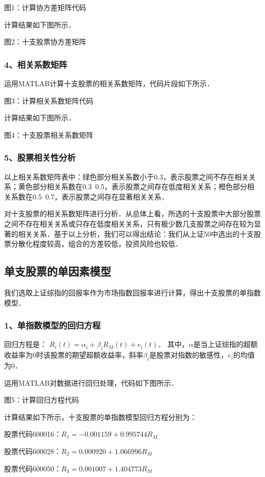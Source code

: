 图1：计算协方差矩阵代码

计算结果如下图所示．

图2：十支股票协方差矩阵

\subsubsection{4、相关系数矩阵}
运用MATLAB计算十支股票的相关系数矩阵，代码片段如下所示．

图3：计算相关系数矩阵代码

计算结果如下图所示．

图4：十支股票相关系数矩阵
\subsubsection{5、股票相关性分析}
以上相关系数矩阵表中：绿色部分相关系数小于0.3，表示股票之间不存在相关关系；黄色部分相关系数在0.3~0.5，表示股票之间存在低度相关关系；橙色部分相关系数在0.5~0.7，表示股票之间存在显著相关关系．

对十支股票的相关系数矩阵进行分析．从总体上看，所选的十支股票中大部分股票之间不存在相关关系或只存在低度相关关系，只有极少数几支股票之间存在较为显著的相关关系．基于以上分析，我们可以得出结论：我们从上证50中选出的十支股票分散化程度较高，组合的方差较低，投资风险也较低．

\subsection{单支股票的单因素模型}
我们选取上证综指的回报率作为市场指数回报率进行计算，得出十支股票的单指数模型．
\subsubsection{1、单指数模型的回归方程}

回归方程是：
$R_{i}(t)=\alpha_{i}+\beta_{i}R_{M}(t)+e_{i}(t)$．
其中，$\alpha$是当上证综指的超额收益率为0时该股票的期望超额收益率，斜率$\beta_{i}$是股票对指数的敏感性，$e_{i}$的均值为0．

运用MATLAB对数据进行回归处理，代码如下图所示．

图5：计算回归方程代码

计算结果如下所示，十支股票的单指数模型回归方程分别为：

股票代码600016：$R_{1}=-0.001159 + 0.995744R_{M}$

股票代码600028：$R_{2}=0.000920 + 1.066996R_{M}$

股票代码600050：$R_{3}=0.001007 + 1.404773R_{M}$

